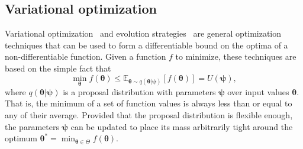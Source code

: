\documentclass[twocolumn,superscriptaddress,aps]{revtex4-1}
\newcommand{\bftheta}{{\bm \theta}}
\newcommand{\bfpsi}{{\bm \psi}}
\theoremstyle{plain}
\begin{document}
\subsection{Variational optimization}

Variational optimization~\cite{2012arXiv1212.4507S,staines2013optimization} and evolution strategies~\citep{2011arXiv1106.4487W} are general
optimization techniques that can be used to form a differentiable bound
on the optima of a non-differentiable function. Given a function $f$ to minimize,
these techniques are based on the simple fact that
\begin{equation}
    \min_{\bftheta} f(\bftheta) \leq \mathbb{E}_{\bftheta \sim q(\bftheta|\bfpsi)} [f(\bftheta)] = U(\bfpsi),
\end{equation}
where $q(\bftheta|\bfpsi)$ is a proposal distribution with parameters $\bfpsi$ over input values $\bftheta$.
That is, the minimum of a set of function values is always less than or equal
to any of their average. Provided that the proposal distribution is flexible enough, the parameters $\bfpsi$
can be updated to place its mass arbitrarily tight around the optimum $\bftheta^* = \min_{\bftheta \in \Theta} f(\bftheta)$.
\end{document}
